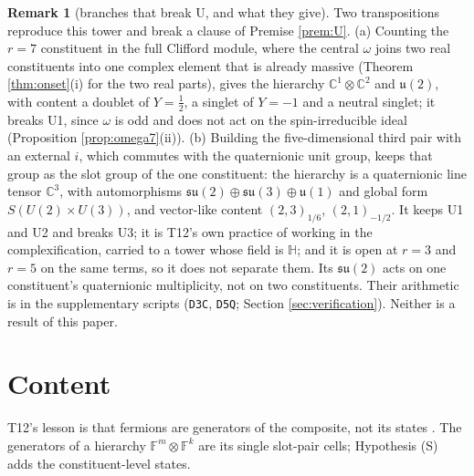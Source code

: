 \documentclass[11pt]{article}
\theoremstyle{definition}
\newtheorem{remark}[theorem]{Remark}
\newcommand{\C}{\mathbb{C}}
\newcommand{\HH}{\mathbb{H}}
\newcommand{\F}{\mathbb{F}}
\newcommand{\su}{\mathfrak{su}}
\newcommand{\uu}{\mathfrak{u}}
\newcommand{\file}[1]{\texttt{#1}}
\begin{document}
\begin{remark}[branches that break U, and what they give]\label{rem:branches}
Two transpositions reproduce this tower and break a clause of Premise \ref{prem:U}. (a) Counting the $r = 7$ constituent in the full Clifford module, where the central $\omega$ joins two real constituents into one complex element that is already massive (Theorem \ref{thm:onset}(i) for the two real parts), gives the hierarchy $\C^{1} \otimes \C^{2}$ and $\uu(2)$, with content a doublet of $Y = \tfrac{1}{2}$, a singlet of $Y = -1$ and a neutral singlet; it breaks U1, since $\omega$ is odd and does not act on the spin-irreducible ideal (Proposition \ref{prop:omega7}(ii)). (b) Building the five-dimensional third pair with an external $i$, which commutes with the quaternionic unit group, keeps that group as the slot group of the one constituent: the hierarchy is a quaternionic line tensor $\C^{3}$, with automorphisms $\su(2) \oplus \su(3) \oplus \uu(1)$ and global form $S(U(2) \times U(3))$, and vector-like content $(2,3)_{1/6}$, $(2,1)_{-1/2}$. It keeps U1 and U2 and breaks U3; it is T12's own practice of working in the complexification, carried to a tower whose field is $\HH$; and it is open at $r = 3$ and $r = 5$ on the same terms, so it does not separate them. Its $\su(2)$ acts on one constituent's quaternionic multiplicity, not on two constituents. Their arithmetic is in the supplementary scripts (\file{D3C}, \file{D5Q}; Section \ref{sec:verification}). Neither is a result of this paper.
\end{remark}

\section{Content}\label{sec:content}

T12's lesson is that fermions are generators of the composite, not its states \cite[Rem.~5.2, Prop.~5.3]{ButlerT12}. The generators of a hierarchy $\F^{m} \otimes \F^{k}$ are its single slot-pair cells; Hypothesis (S) adds the constituent-level states.
\end{document}
